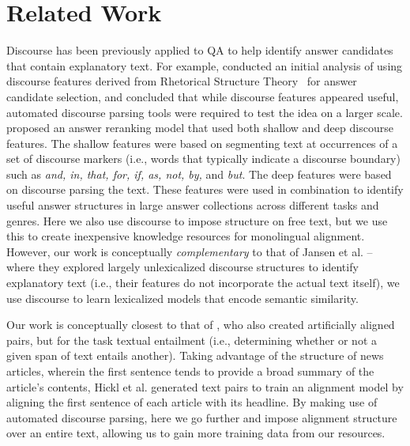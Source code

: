 \section{Related Work}
Discourse has been previously applied to QA to help identify answer candidates that contain explanatory text.  For example, \citet{Verberne:2007} conducted an initial analysis of using discourse features derived from Rhetorical Structure Theory~\citep[RST;][]{mann88} for answer candidate selection, and concluded that while discourse features appeared useful, automated discourse parsing tools were required to test the idea on a larger scale.  
\citet{jansen14} proposed an answer reranking model that used both shallow and deep discourse features.  The shallow features were based on segmenting text at occurrences of a set of discourse markers \citep{marcu97} (i.e., words that typically indicate a discourse boundary) such as \textit{and, in, that, for, if, as, not, by,} and \textit{but}.  The deep features were based on discourse parsing the text.  These features were used in combination to identify useful answer structures in large answer collections across different tasks and genres.  Here we also use discourse to impose structure on free text, but we use this to create inexpensive knowledge resources for monolingual alignment. However, our work is conceptually \textit{complementary} to that of Jansen et al. -- where they explored largely unlexicalized discourse structures to identify explanatory text (i.e., their features do not incorporate the actual text itself), we use discourse to learn lexicalized models that encode semantic similarity.

Our work is conceptually closest to that of \citet{hickl2006recognizing}, who also created artificially aligned pairs, but for the task textual entailment (i.e., determining whether or not a given span of text entails another).  Taking advantage of the structure of news articles, wherein the first sentence tends to provide a broad summary of the article's contents, Hickl et al. generated text pairs to train an alignment model by aligning the first sentence of each article with its headline.  By making use of automated discourse parsing, here we go further and impose alignment structure over an entire text, allowing us to gain more training data from our resources.

